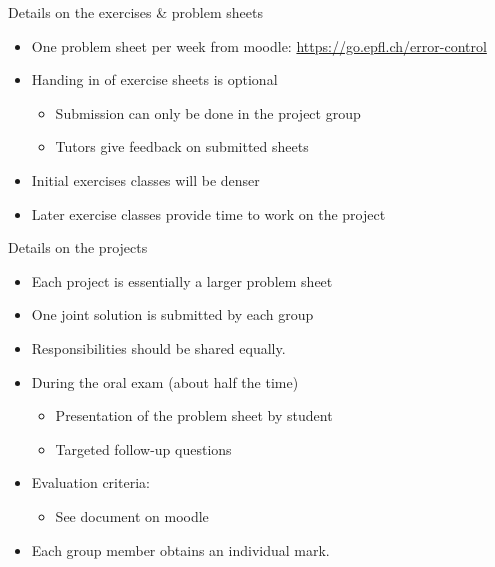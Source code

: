 \begin{frame}{Details on the exercises \& problem sheets}
    \begin{itemize}
        \item One problem sheet per week from moodle: \url{https://go.epfl.ch/error-control}
        \vspace{1em}
        \item Handing in of exercise sheets is optional
            \begin{itemize}
                \item Submission can only be done in the project group
                \item Tutors give feedback on submitted sheets
            \end{itemize}
        \vspace{1em}
        \item Initial exercises classes will be denser
        \vspace{1em}
        \item Later exercise classes provide time to work on the project
    \end{itemize}
\end{frame}

\begin{frame}{Details on the projects}
    \begin{itemize}
        \item Each project is essentially a larger problem sheet
        \item One joint solution is submitted by each group
        \item Responsibilities should be shared equally.
        \vspace{1.0em}
        \item During the oral exam \textcolor{grey5}{(about half the time)}
            \begin{itemize}
                \item Presentation of the problem sheet by student
                \item Targeted follow-up questions
            \end{itemize}
        \vspace{1.0em}
        \item Evaluation criteria:
            \begin{itemize}
                \item See document on moodle
            \end{itemize}
        \vspace{1.0em}
        \item Each group member obtains an \alert{individual} mark.
    \end{itemize}
\end{frame}

